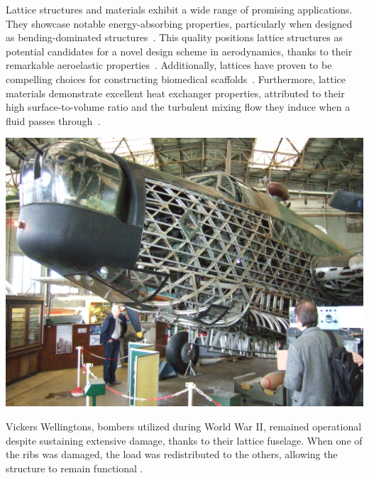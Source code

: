Lattice structures and materials exhibit a wide range of promising applications. They showcase notable energy-absorbing properties, particularly when designed as bending-dominated structures~. This quality positions lattice structures as potential candidates for a novel design scheme in aerodynamics, thanks to their remarkable aeroelastic properties~. Additionally, lattices have proven to be compelling choices for constructing biomedical scaffolds~. Furthermore, lattice materials demonstrate excellent heat exchanger properties, attributed to their high surface-to-volume ratio and the turbulent mixing flow they induce when a fluid passes through~.
\begin{marginfigure}
        \includegraphics[width=\linewidth]{figures/02_literature/wellington.jpg}
        \caption{Vickers Wellingtons, bombers utilized during World War II, remained operational despite sustaining extensive damage, thanks to their lattice fuselage. When one of the ribs was damaged, the load was redistributed to the others, allowing the structure to remain functional \cite{airshowconsultants_real_2013}.}
        \label{fig:vick}
\end{marginfigure}
